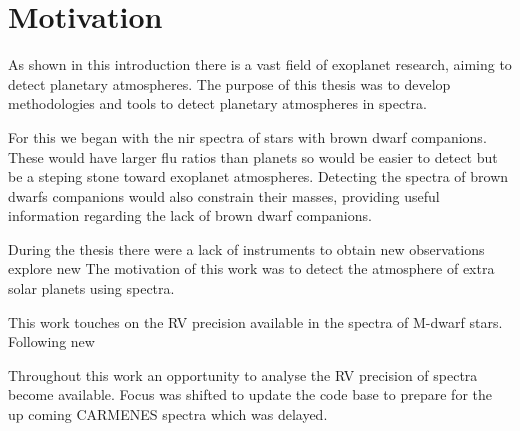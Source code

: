 
\section{Motivation}

As shown in this introduction there is a vast field of exoplanet research, aiming to detect planetary atmospheres. The purpose of this thesis was to develop methodologies and tools to detect planetary atmospheres in \nir{} spectra.

For this we began with the nir spectra of stars with brown dwarf companions. These would have larger flu ratios than planets so would be easier to detect but be a steping stone toward exoplanet atmospheres. Detecting the spectra of brown dwarfs companions would also constrain their masses, providing useful information regarding the lack of brown dwarf companions.


During the thesis there were a lack of \nir{} instruments to obtain new observations  explore new 
The motivation of this work was to detect the atmosphere of extra solar planets using \nir{} spectra.

This work touches on the RV precision available in the \nir spectra of M-dwarf stars. Following new

Throughout this work an opportunity to analyse the RV precision of spectra become available. Focus was shifted to update the code base to prepare for the up coming CARMENES spectra which was delayed. 